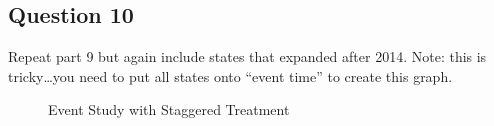 \documentclass[
]{article}
\begin{document}
\subsection{Question 10}\label{question-10}

Repeat part 9 but again include states that expanded after 2014. Note:
this is tricky\ldots you need to put all states onto ``event time'' to
create this graph.

\begin{figure}


\caption{\label{fig-eventstudy2}Event Study with Staggered Treatment}

\end{figure}%
\end{document}
